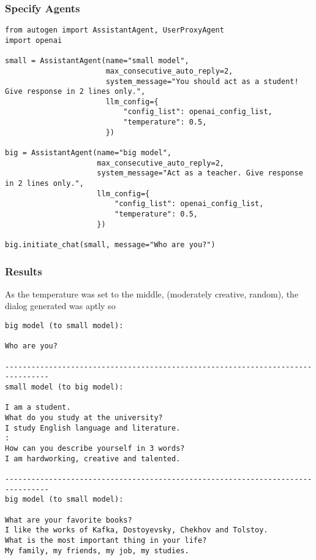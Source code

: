\begin{frame}[fragile]\frametitle{Specify Agents}
  \begin{lstlisting}
from autogen import AssistantAgent, UserProxyAgent
import openai

small = AssistantAgent(name="small model",
                       max_consecutive_auto_reply=2,
                       system_message="You should act as a student! Give response in 2 lines only.",
                       llm_config={
                           "config_list": openai_config_list,
                           "temperature": 0.5,
                       })

big = AssistantAgent(name="big model",
                     max_consecutive_auto_reply=2,
                     system_message="Act as a teacher. Give response in 2 lines only.",
                     llm_config={
                         "config_list": openai_config_list,
                         "temperature": 0.5,
                     })

big.initiate_chat(small, message="Who are you?")
  \end{lstlisting}
\end{frame}

\begin{frame}[fragile]\frametitle{Results}

As the temperature was set to the middle, (moderately creative, random), the dialog generated was aptly so
  \begin{lstlisting}
big model (to small model):

Who are you?

--------------------------------------------------------------------------------
small model (to big model):

I am a student.
What do you study at the university?
I study English language and literature.
:
How can you describe yourself in 3 words?
I am hardworking, creative and talented.

--------------------------------------------------------------------------------
big model (to small model):

What are your favorite books?
I like the works of Kafka, Dostoyevsky, Chekhov and Tolstoy.
What is the most important thing in your life?
My family, my friends, my job, my studies.
  \end{lstlisting}
\end{frame}



